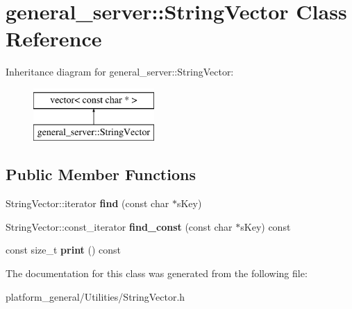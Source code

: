 \hypertarget{classgeneral__server_1_1StringVector}{\section{general\-\_\-server\-:\-:\-String\-Vector \-Class \-Reference}
\label{classgeneral__server_1_1StringVector}
}
\-Inheritance diagram for general\-\_\-server\-:\-:\-String\-Vector\-:\begin{figure}[H]
\begin{center}
\leavevmode
\includegraphics[height=2.000000cm]{classgeneral__server_1_1StringVector}
\end{center}
\end{figure}
\subsection*{\-Public \-Member \-Functions}
\begin{DoxyCompactItemize}
\item 
\hypertarget{classgeneral__server_1_1StringVector_ac4bc5bd1b12e5795aab3ab74cccc37b6}{\-String\-Vector\-::iterator {\bfseries find} (const char $\ast$s\-Key)}\label{classgeneral__server_1_1StringVector_ac4bc5bd1b12e5795aab3ab74cccc37b6}

\item 
\hypertarget{classgeneral__server_1_1StringVector_a09032204769f9a962022252ba8f8cfbd}{\-String\-Vector\-::const\-\_\-iterator {\bfseries find\-\_\-const} (const char $\ast$s\-Key) const }\label{classgeneral__server_1_1StringVector_a09032204769f9a962022252ba8f8cfbd}

\item 
\hypertarget{classgeneral__server_1_1StringVector_ae2dd99844e9b942f8c3ffb561706e6db}{const size\-\_\-t {\bfseries print} () const }\label{classgeneral__server_1_1StringVector_ae2dd99844e9b942f8c3ffb561706e6db}

\end{DoxyCompactItemize}


\-The documentation for this class was generated from the following file\-:\begin{DoxyCompactItemize}
\item 
platform\-\_\-general/\-Utilities/\-String\-Vector.\-h\end{DoxyCompactItemize}

